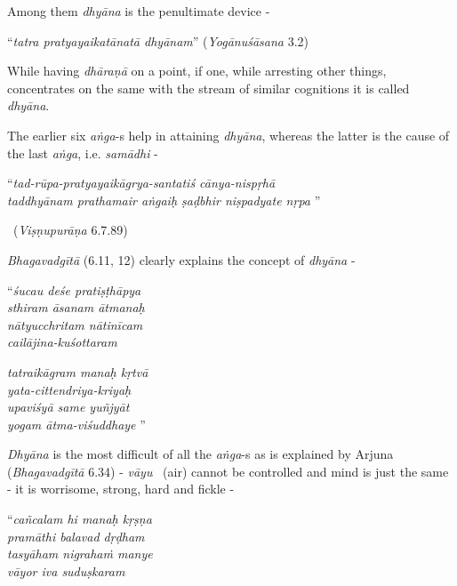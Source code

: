 Among them \textit{dhyāna} is the penultimate device -

\begin{myquote}
“\textit{tatra pratyayaikatānatā dhyānam}” (\textit{Yogānuśāsana} 3.2)
\end{myquote}

While having \textit{dhāraṇā} on a point, if one, while arresting other things, concentrates on the same with the stream of similar cognitions it is called \textit{dhyāna}.

The earlier six \textit{aṅga}-s help in attaining \textit{dhyāna}, whereas the latter is the cause of the last \textit{aṅga}, i.e. \textit{samādhi} -

\begin{myquote}
“\textit{tad-rūpa-pratyayaikāgrya-santatiś cānya-nispṛhā }\\ \textit{taddhyānam prathamair aṅgaiḥ ṣaḍbhir niṣpadyate nṛpa} ” 

~\hfill (\textit{Viṣṇupurāṇa} 6.7.89)
\end{myquote}

\textit{Bhagavadgītā} (6.11, 12) clearly explains the concept of \textit{dhyāna} -

\begin{centerquote}
“\textit{śucau deśe pratiṣṭhāpya}\\ \textit{sthiram āsanam ātmanaḥ }\\ \textit{nātyucchritam nātinīcam}\\ \textit{cailājina-kuśottaram }
\end{centerquote}

\begin{centerquote}
\textit{tatraikāgram manaḥ kṛtvā}\\ \textit{yata-cittendriya-kriyaḥ }\\ \textit{upaviśyā same yuñjyāt}\\ \textit{yogam ātma-viśuddhaye} ”
\end{centerquote}

\textit{Dhyāna} is the most difficult of all the \textit{aṅga}-s as is explained by Arjuna (\textit{Bhagavadgītā} 6.34) - \textit{vāyu}  (air) cannot be controlled and mind is just the same - it is worrisome, strong, hard and fickle -

\begin{centerquote}
“\textit{cañcalam hi manaḥ kṛṣṇa}\\ \textit{pramāthi balavad dṛḍham }\\ \textit{tasyāham nigrahaṁ manye}\\ \textit{vāyor iva suduṣkaram} 
\end{centerquote}

